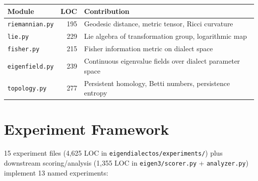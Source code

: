 \documentclass[11pt,a4paper]{article}
\begin{document}
\begin{table}[H]
\centering
\begin{tabular}{@{}lrl@{}}
\toprule
\textbf{Module} & \textbf{LOC} & \textbf{Contribution} \\
\midrule
\texttt{riemannian.py} & 195 & Geodesic distance, metric tensor, Ricci curvature \\
\texttt{lie.py} & 229 & Lie algebra of transformation group, logarithmic map \\
\texttt{fisher.py} & 215 & Fisher information metric on dialect space \\
\texttt{eigenfield.py} & 239 & Continuous eigenvalue fields over dialect parameter space \\
\texttt{topology.py} & 277 & Persistent homology, Betti numbers, persistence entropy \\
\bottomrule
\end{tabular}
\end{table}


\section{Experiment Framework}

15 experiment files (4{,}625 LOC in \texttt{eigendialectos/experiments/}) plus
downstream scoring/analysis (1{,}355 LOC in \texttt{eigen3/scorer.py} +
\texttt{analyzer.py}) implement 13 named experiments:
\end{document}
